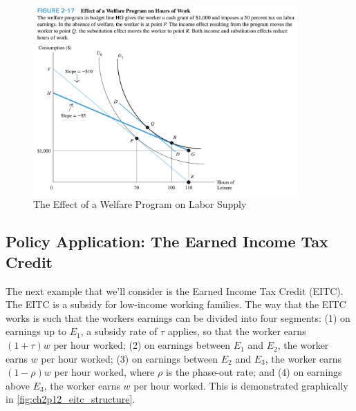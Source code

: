 \begin{figure}[!htb]
    \centering
        \includegraphics[width=0.9\textwidth]{../input/ch_2p11_welfare_hours_worked.png}
    \caption{The Effect of a Welfare Program on Labor Supply}
    \label{fig:ch2p11_welfare_hours_worked}
\end{figure}

\FloatBarrier

\subsection{Policy Application: The Earned Income Tax Credit}

The next example that we'll consider is the Earned Income Tax Credit (EITC).
The EITC is a subsidy for low-income working families.
The way that the EITC works is such that the workers earnings can be 
divided into four segments:
(1) on earnings up to $E_1$, 
a subsidy rate of $\tau$ applies, so that the 
worker earns $(1+\tau)w$ per hour worked;
(2) on earnings between $E_1$ and $E_2$,
the worker earns $w$ per hour worked;
(3) on earnings between $E_2$ and $E_3$,
the worker earns $(1-\rho)w$ per hour worked, where $\rho$ is
the phase-out rate; and
(4) on earnings above $E_3$, the worker earns $w$ per hour worked.
This is demonstrated graphically in \autoref{fig:ch2p12_eitc_structure}.

\FloatBarrier

